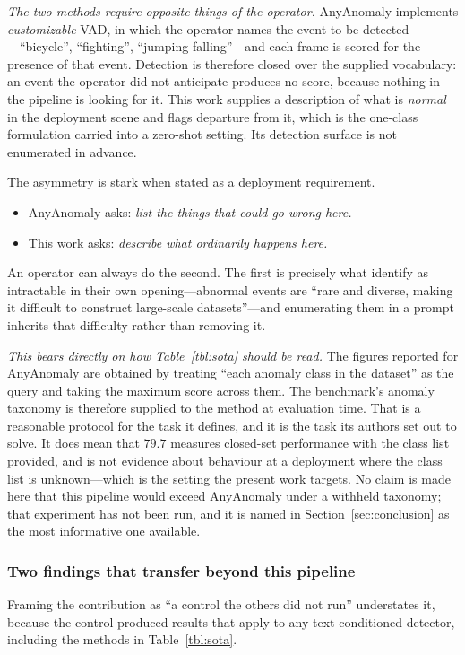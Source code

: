 \documentclass[a4paper,fleqn]{cas-sc}
\begin{document}
\emph{The two methods require opposite things of the operator.} AnyAnomaly
implements \emph{customizable} VAD, in which the operator names the event to be
detected---``bicycle'', ``fighting'', ``jumping-falling''---and each frame is
scored for the presence of that event. Detection is therefore closed over the
supplied vocabulary: an event the operator did not anticipate produces no
score, because nothing in the pipeline is looking for it. This work supplies a
description of what is \emph{normal} in the deployment scene and flags departure
from it, which is the one-class formulation carried into a zero-shot setting.
Its detection surface is not enumerated in advance.

The asymmetry is stark when stated as a deployment requirement.
\begin{itemize}
  \item AnyAnomaly asks: \emph{list the things that could go wrong here.}
  \item This work asks: \emph{describe what ordinarily happens here.}
\end{itemize}
An operator can always do the second. The first is precisely what
\citet{anyanomaly2025} identify as intractable in their own opening---abnormal
events are ``rare and diverse, making it difficult to construct large-scale
datasets''---and enumerating them in a prompt inherits that difficulty rather
than removing it.

\emph{This bears directly on how Table~\ref{tbl:sota} should be read.} The
figures reported for AnyAnomaly are obtained by treating ``each anomaly class in
the dataset'' as the query and taking the maximum score across them. The
benchmark's anomaly taxonomy is therefore supplied to the method at evaluation
time. That is a reasonable protocol for the task it defines, and it is the task
its authors set out to solve. It does mean that $79.7$ measures closed-set
performance with the class list provided, and is not evidence about behaviour at
a deployment where the class list is unknown---which is the setting the present
work targets. No claim is made here that this pipeline would exceed AnyAnomaly
under a withheld taxonomy; that experiment has not been run, and it is named in
Section~\ref{sec:conclusion} as the most informative one available.

\subsubsection{Two findings that transfer beyond this pipeline}
Framing the contribution as ``a control the others did not run'' understates it,
because the control produced results that apply to any text-conditioned
detector, including the methods in Table~\ref{tbl:sota}.
\end{document}
